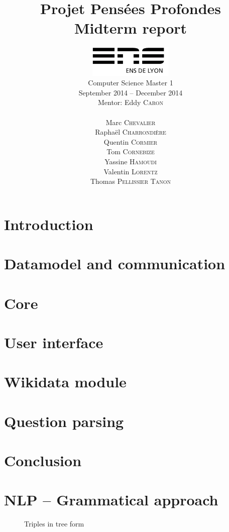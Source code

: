 \documentclass[a4paper,10pt]{report}
\title{Projet Pensées Profondes\\\large Midterm report}
\author{\includegraphics[width=0.3\textwidth]{../logo_ensl.pdf}\\[50pt]
Computer Science Master 1\\September 2014 \--- December 2014\\[50pt]
Mentor: Eddy \textsc{Caron}\\[50pt]
\begin{minipage}{0.4\textwidth}
    \begin{flushleft} \large
        Marc \textsc{Chevalier}
        \\
        Raphaël \textsc{Charrondière}
        \\
        Quentin \textsc{Cormier}
        \\
        Tom \textsc{Cornebize}
    \end{flushleft}
\end{minipage}
\begin{minipage}{0.4\textwidth}
    \begin{flushright} \large
        Yassine \textsc{Hamoudi}
        \\
        Valentin \textsc{Lorentz}
        \\
        Thomas \textsc{Pellissier Tanon}
        \\
    \end{flushright}
\end{minipage}
}
\date{}
\begin{document}
\maketitle



\tableofcontents

\chapter*{Introduction}


\chapter{Datamodel and communication}


\chapter{Core}


\chapter{User interface}


\chapter{Wikidata module}


\chapter{Question parsing}





\chapter*{Conclusion}


\appendix

\chapter{NLP \--- Grammatical approach}

\begin{figure}
\caption{Triples in tree form}
\label{triple_tree}

\end{figure}



\nocite{*}
\end{document}
